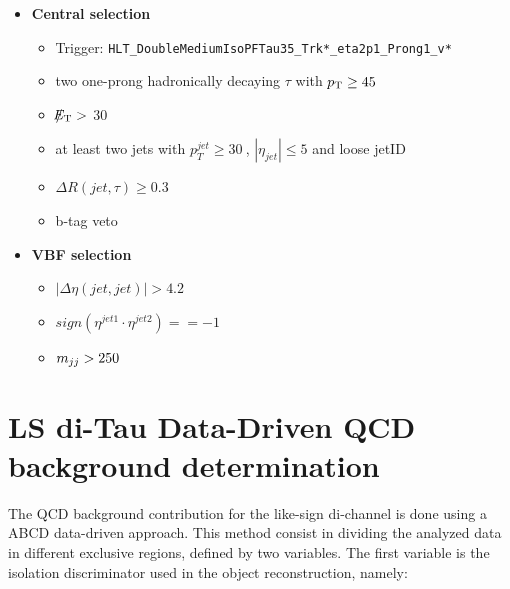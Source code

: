 \begin{itemize}
	\item \textbf{Central selection}
	\begin{itemize}
		\item Trigger: \texttt{HLT\_DoubleMediumIsoPFTau35\_Trk*\_eta2p1\_Prong1\_v*}
		\item two one-prong hadronically decaying $\tau$ with $p_{\text{T}}\geq45~$\gev 
		\item $\slash\mkern-12mu{E}_{\text{T}} > $ 30
		\item at least two jets with $p_{T}^{jet}\geq30~$\gev, $|\eta_{jet}|\leq5$ and loose jetID
		\item $\Delta R(jet,\tau)\geq0.3$
		\item b-tag veto
	\end{itemize}
	\item \textbf{VBF selection}
	\begin{itemize}
		\item $|\Delta\eta(jet,jet)| > 4.2$
		\item $sign(\eta^{jet 1}\cdot\eta^{jet 2})==-1$
		\item $m_{jj}>250~$\gev
	\end{itemize}
\end{itemize}


\clearpage



\section {LS di-Tau Data-Driven QCD background determination} \label{sec:bgestimation}


The QCD background contribution for the like-sign di-\hadtau channel is done using a ABCD data-driven approach. This method consist in  dividing the analyzed data in different exclusive regions, defined by two variables. The first variable is the \hadtau isolation discriminator used in the object reconstruction, namely:
 	
 	
